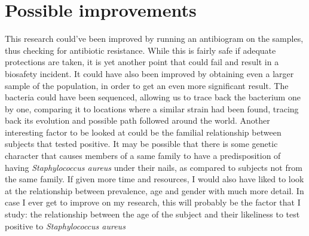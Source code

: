 \section{Possible improvements}
This research could've been improved by running an antibiogram on the samples, thus checking for antibiotic resistance. While this is fairly safe if adequate protections are taken, it is yet another point that could fail and result in a biosafety incident.\newline
It could have also been improved by obtaining even a larger sample of the population, in order to get an even more significant result. The bacteria could have been sequenced, allowing us to trace back the bacterium one by one, comparing it to locations where a similar strain had been found, tracing back its evolution and possible path followed around the world.\newline
Another interesting factor to be looked at could be the familial relationship between subjects that tested positive. It may be possible that there is some genetic character that causes members of a same family to have a predisposition of having \emph{Staphylococcus aureus} under their nails, as compared to subjects not from the same family.\newline
If given more time and resources, I would also have liked to look at the relationship between prevalence, age and gender with much more detail. In case I ever get to improve on my research, this will probably be the factor that I study: the relationship between the age of the subject and their likeliness to test positive to \emph{Staphylococcus aureus}
